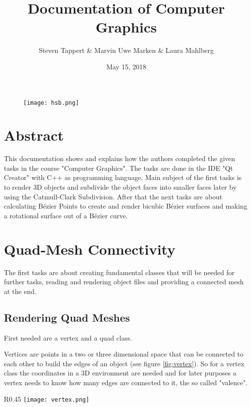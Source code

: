 \documentclass[11.5pt,oneside,a4paper]{scrartcl}
\title{Documentation of Computer Graphics}
\author{Steven Tappert \& Marvin Uwe Marken \& Laura Mahlberg}
\date{May 15, 2018}
\newcounter{ct}
\begin{document}
\clearpage
{\let\newpage\relax\maketitle}
\thispagestyle{empty}
\vspace{20pt}

\begin{figure}
	\centering
	\texttt{[image: hsb.png]} \\
\end{figure}

\newpage
\tableofcontents
\newpage

\section{Abstract}
This documentation shows and explains how the authors completed the given tasks in the course "Computer Graphics". The tasks are done in the IDE "Qt Creator" with C++ as programming language. Main subject of the first tasks is to render 3D objects and subdivide the object faces into smaller faces later by using the Catmull-Clark Subdivision. After that the next tasks are about calculating Bézier Points to create and render bicubic Bézier surfaces and making a rotational surface out of a Bézier curve.

\section{Quad-Mesh Connectivity}

The first tasks are about creating fundamental classes that will be needed for further tasks, reading and rendering object files and providing a connected mesh at the end.


\subsection{Rendering Quad Meshes}

First needed are a vertex and a quad class.

Vertices are points in a two or three dimensional space that can be connected to each other to build the edges of an object (see figure \ref{fig:vertex}). So for a vertex class the coordinates in a 3D environment are needed and for later purposes a vertex needs to know how many edges are connected to it, the so called "valence".

\begin{wrapfigure}{R}{0.45\textwidth}
	\centering
	\texttt{[image: vertex.png]}
	\caption{Vertex with some edges to other vertices}
	\label{fig:vertex}
	\vspace{0.6cm}
\end{wrapfigure}
\end{document}
